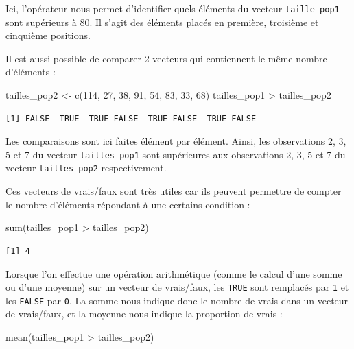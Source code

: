 \documentclass[
  letterpaper,
  DIV=11,
  numbers=noendperiod]{scrreprt}
\newenvironment{Shaded}{\begin{snugshade}}{\end{snugshade}}
\newcommand{\DecValTok}[1]{\textcolor[rgb]{0.68,0.00,0.00}{#1}}
\newcommand{\FunctionTok}[1]{\textcolor[rgb]{0.28,0.35,0.67}{#1}}
\newcommand{\NormalTok}[1]{\textcolor[rgb]{0.00,0.23,0.31}{#1}}
\newcommand{\OtherTok}[1]{\textcolor[rgb]{0.00,0.23,0.31}{#1}}
\newcommand{\SpecialCharTok}[1]{\textcolor[rgb]{0.37,0.37,0.37}{#1}}
\begin{document}
Ici, l'opérateur nous permet d'identifier quels éléments du vecteur
\texttt{taille\_pop1} sont supérieurs à 80. Il s'agit des éléments
placés en première, troisième et cinquième positions.

Il est aussi possible de comparer 2 vecteurs qui contiennent le même
nombre d'éléments :

\begin{Shaded}
\begin{Highlighting}[]
\NormalTok{tailles\_pop2 }\OtherTok{\textless{}{-}} \FunctionTok{c}\NormalTok{(}\DecValTok{114}\NormalTok{, }\DecValTok{27}\NormalTok{, }\DecValTok{38}\NormalTok{, }\DecValTok{91}\NormalTok{, }\DecValTok{54}\NormalTok{, }\DecValTok{83}\NormalTok{, }\DecValTok{33}\NormalTok{, }\DecValTok{68}\NormalTok{)}
\NormalTok{tailles\_pop1 }\SpecialCharTok{\textgreater{}}\NormalTok{ tailles\_pop2}
\end{Highlighting}
\end{Shaded}

\begin{verbatim}
[1] FALSE  TRUE  TRUE FALSE  TRUE FALSE  TRUE FALSE
\end{verbatim}

Les comparaisons sont ici faites élément par élément. Ainsi, les
observations 2, 3, 5 et 7 du vecteur \texttt{tailles\_pop1} sont
supérieures aux observations 2, 3, 5 et 7 du vecteur
\texttt{tailles\_pop2} respectivement.

Ces vecteurs de vrais/faux sont très utiles car ils peuvent permettre de
compter le nombre d'éléments répondant à une certains condition :

\begin{Shaded}
\begin{Highlighting}[]
\FunctionTok{sum}\NormalTok{(tailles\_pop1 }\SpecialCharTok{\textgreater{}}\NormalTok{ tailles\_pop2)}
\end{Highlighting}
\end{Shaded}

\begin{verbatim}
[1] 4
\end{verbatim}

Lorsque l'on effectue une opération arithmétique (comme le calcul d'une
somme ou d'une moyenne) sur un vecteur de vrais/faux, les \texttt{TRUE}
sont remplacés par \texttt{1} et les \texttt{FALSE} par \texttt{0}. La
somme nous indique donc le nombre de vrais dans un vecteur de
vrais/faux, et la moyenne nous indique la proportion de vrais :

\begin{Shaded}
\begin{Highlighting}[]
\FunctionTok{mean}\NormalTok{(tailles\_pop1 }\SpecialCharTok{\textgreater{}}\NormalTok{ tailles\_pop2)}
\end{Highlighting}
\end{Shaded}
\end{document}

